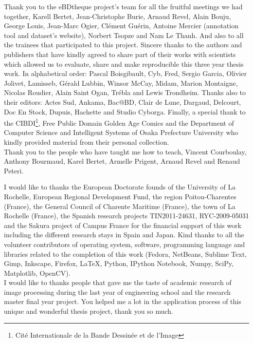 Thank you to the eBDtheque project's team for all the fruitful meetings we had together, Karell Bertet, Jean-Christophe Burie, Arnaud Revel, Alain Bouju, George Louis, Jean-Marc Ogier, Cl\'{e}ment Gu\'{e}rin, Antoine Mercier (annotation tool and dataset's website), Norbert Tsopze and Nam Le Thanh.
And also to all the trainees that participated to this project.
Sincere thanks to the authors and publishers that have kindly agreed to share part of their works with scientists which allowed us to evaluate, share and make reproducible this three year thesis work.
In alphabetical order: Pascal Boisgibault, Cyb, Fred, Sergio Garcia, Olivier Jolivet, Lamisseb, G\'{e}rald Lubbin, Winsor McCay, Midam, Marion Montaigne, Nicolas Roudier, Alain Saint Ogan, Tr\'ebla and Lewis Trondheim.
Thanks also to their editors: Actes Sud, Ankama, Bac@BD, Clair de Lune, Dargaud, Delcourt, Doc En Stock, Dupuis, Hachette and Studio Cyborga.
Finally, a special thank to the CIBDI\footnote{Cit\'e Internationale de la Bande Dessin\'ee et de l'Image}, Free Public Domain Golden Age Comics and the Department of Computer Science and Intelligent Systems of Osaka Prefecture University who kindly provided material from their personal collection.
\\


Thank you to the people who have taught me how to teach, Vincent Courboulay, Anthony Bourmaud, Karel Bertet, Armelle Prigent, Arnaud Revel and Renaud Peteri.

I would like to thanks the European Doctorate founds of the  University of La Rochelle, European Regional Development Fund, the region Poitou-Charentes (France), the General Council of Charente Maritime (France), the town of La Rochelle (France), the Spanish research projects TIN2011-24631, RYC-2009-05031 and the Sakura project of Campus France for the financial support of this work including the different research stays in Spain and Japan.
Kind thanks to all the volunteer contributors of operating system, software, programming language and libraries related to the completion of this work (Fedora, NetBeans, Sublime Text, Gimp, Inkscape, Firefox, \LaTeX, Python, IPython Notebook, Numpy, SciPy, Matplotlib, OpenCV).
\\

I would like to thanks people that gave me the taste of academic research of image processing during the last year of engineering school and the research master final year project.
You helped me a lot in the application process of this unique and wonderful thesis project, thank you so much.
\\

